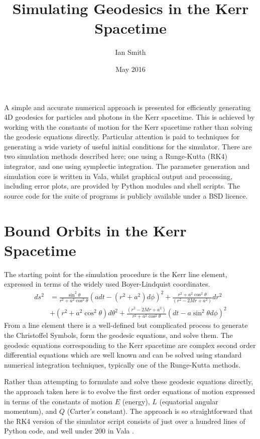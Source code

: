 \documentclass[11pt]{article}
\title{\textbf{Simulating Geodesics in the Kerr Spacetime}}
\author{Ian Smith}
\date{May 2016}
\begin{document}
\maketitle

\abstract
A simple and accurate numerical approach is presented for efficiently generating 4D geodesics for particles and photons in the Kerr spacetime.
This is achieved by working with the constants of motion for the Kerr spacetime rather than solving the geodesic equations directly.
Particular attention is paid to techniques for generating a wide variety of useful initial conditions for the simulator.
There are two simulation methods described here; one using a Runge-Kutta (RK4) integrator, and one using symplectic integration.
The parameter generation and simulation core is written in Vala, whilst graphical output and processing, including error plots, are provided by Python modules and shell scripts.
The source code for the suite of programs is publicly available under a BSD licence.

\section{Bound Orbits in the Kerr Spacetime}

The starting point for the simulation procedure is the Kerr line element, expressed in terms of the widely used Boyer-Lindquist coordinates.
\begin{equation}
\begin{aligned}
d s^2 &= \frac{ \sin^2 \theta } {r^2 + a^2 \cos^2 \theta} (a dt - (r^2 + a^2)d \phi )^2 + \frac{ r^2 + a^2 \cos^2 \theta } {(r^2 - 2Mr  + a^2)} d r^2 \\
&+ (r^2 + a^2 \cos^2 \theta) d \theta^2 + \frac{ (r^2 - 2Mr  + a^2) } {r^2 + a^2 \cos^2 \theta} (dt - a \sin^2 \theta d \phi )^2
\end{aligned}
\end{equation}
From a line element there is a well-defined but complicated process to generate the Christoffel Symbols, form the geodesic equations, and solve them.
The geodesic equations corresponding to the Kerr spacetime are complex second order differential equations which are well known and can be solved using standard numerical integration techniques, typically one of the Runge-Kutta methods.

Rather than attempting to formulate and solve these geodesic equations directly, the approach taken here is to evolve the first order equations of motion expressed in terms of the constants of motion $E$ (energy), $L$ (equatorial angular momentum), and $Q$ (Carter's constant).
The approach is so straightforward that the RK4 version of the simulator script consists of just over a hundred lines of Python code, and well under 200 in Vala \cite{m4r35n357}.
\end{document}
